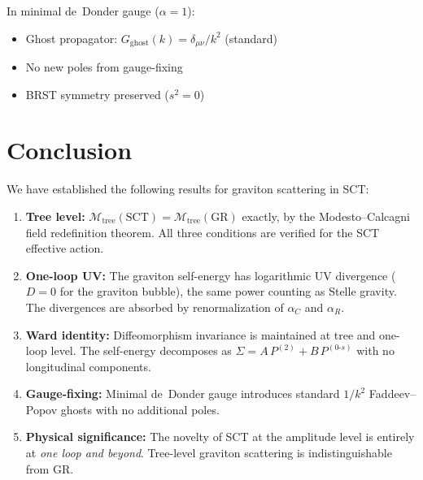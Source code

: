 \documentclass[11pt,a4paper]{article}
\theoremstyle{definition}
\theoremstyle{remark}
\begin{document}
In minimal de~Donder gauge ($\alpha = 1$):
\begin{itemize}
  \item Ghost propagator: $G_{\mathrm{ghost}}(k) = \delta_{\mu\nu}/k^2$ (standard)
  \item No new poles from gauge-fixing
  \item BRST symmetry preserved ($s^2 = 0$)
\end{itemize}

\section{Conclusion}
\label{sec:conclusion}

We have established the following results for graviton scattering in SCT:

\begin{enumerate}
  \item \textbf{Tree level:} $\mathcal{M}_{\mathrm{tree}}(\mathrm{SCT})
        = \mathcal{M}_{\mathrm{tree}}(\mathrm{GR})$ exactly, by the
        Modesto--Calcagni field redefinition theorem. All three conditions
        are verified for the SCT effective action.

  \item \textbf{One-loop UV:} The graviton self-energy has logarithmic
        UV divergence ($D = 0$ for the graviton bubble), the same power
        counting as Stelle gravity. The divergences are absorbed by
        renormalization of $\alpha_C$ and $\alpha_R$.

  \item \textbf{Ward identity:} Diffeomorphism invariance is maintained
        at tree and one-loop level. The self-energy decomposes as
        $\Sigma = A\,P^{(2)} + B\,P^{(0\text{-}s)}$ with no longitudinal
        components.

  \item \textbf{Gauge-fixing:} Minimal de~Donder gauge introduces
        standard $1/k^2$ Faddeev--Popov ghosts with no additional poles.

  \item \textbf{Physical significance:} The novelty of SCT at the amplitude
        level is entirely at \emph{one loop and beyond}. Tree-level
        graviton scattering is indistinguishable from GR.
\end{enumerate}
\end{document}
